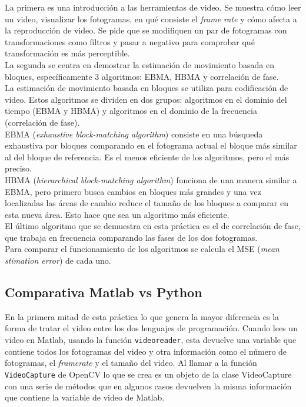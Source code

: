 La primera es una introducción a las herramientas de video. Se muestra cómo leer un video, visualizar los fotogramas, en qué consiste el \emph{frame rate} y cómo afecta a la reproducción de video. Se pide que se modifiquen un par de fotogramas con transformaciones como filtros y pasar a negativo para comprobar qué transformación es más perceptible.\\

La segunda se centra en demostrar la estimación de movimiento basada en bloques, específicamente 3 algoritmos: EBMA, HBMA y correlación de fase.\\

La estimación de movimiento basada en bloques se utiliza para codificación de vídeo. Estos algoritmos se dividen en dos grupos: algoritmos en el dominio del tiempo (EBMA y HBMA) y algoritmos en el dominio de la frecuencia (correlación de fase).\\

EBMA (\emph{exhaustive block-matching algorithm}) consiste en una búsqueda exhaustiva por bloques comparando en el fotograma actual el bloque más similar al del bloque de referencia. Es el menos eficiente de los algoritmos, pero el más preciso.\\

HBMA (\emph{hierarchical block-matching algorithm}) funciona de una manera similar a EBMA, pero primero busca cambios en bloques más grandes y una vez localizadas las áreas de cambio reduce el tamaño de los bloques a comparar en esta nueva área. Esto hace que sea un algoritmo más eficiente.\\

El último algoritmo que se demuestra en esta práctica es el de correlación de fase, que trabaja en frecuencia comparando las fases de los dos fotogramas.\\

Para comparar el funcionamiento de los algoritmos se calcula el MSE (\emph{mean stimation error}) de cada uno.\\

\subsection{Comparativa Matlab vs Python}

En la primera mitad de esta práctica lo que genera la mayor diferencia es la forma de tratar el video entre los dos lenguajes de programación. Cuando lees un video en Matlab, usando la función \texttt{videoreader}, esta devuelve una variable que contiene todos los fotogramas del video y otra información como el número de fotogramas, el \emph{framerate} y el tamaño del video. Al llamar a la función \texttt{VideoCapture} de OpenCV lo que se crea es un objeto de la clase VideoCapture con una serie de métodos que en algunos casos devuelven la misma información que contiene la variable de video de Matlab.\\

